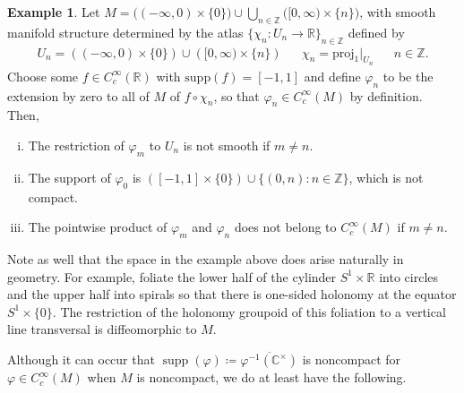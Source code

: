 \documentclass[12pt]{article}
\theoremstyle{plain}
\theoremstyle{definition}
\newtheorem{ex}[thm]{Example}
\newcommand{\R}{\mathbb{R}}
\newcommand{\Z}{\mathbb{Z}}
\newcommand{\C}{\mathbb{C}}
\newcommand{\supp}{\operatorname{supp}}
\numberwithin{equation}{section}
\begin{document}
\begin{ex}\label{nonHausex}
Let $M=\Big((-\infty,0) \times \{0\}\Big) \cup \bigcup_{n \in \Z} \Big([0,\infty) \times \{n\}\Big)$, 
with smooth manifold structure determined by the atlas $\{\chi_n :U_n \to \R\}_{n \in \Z}$ defined by
\begin{align*}
U_n  = \left((-\infty,0) \times \{0\}\right) \cup \left([0,\infty) \times \{n\} \right) &&
\chi_n = \mathrm{proj}_1|_{U_n} && n \in \Z.
\end{align*}
Choose some $f \in C_c^\infty(\R)$ with $\mathrm{supp}(f)=[-1,1]$ and define $\varphi_n$ to be the extension by zero to all of $M$ of $f \circ \chi_n$, so that $\varphi_n \in C_c^\infty(M)$ by definition. Then,
\begin{enumerate}[(i)]
\item The restriction of $\varphi_m$ to $U_n$ is not smooth if $m \neq n$.
\item The support  of $\varphi_0$ is $\left([-1,1] \times \{0 \} \right) \cup \{ (0,n) : n \in \Z \}$, which is not compact.
\item The pointwise product of $\varphi_m$ and $\varphi_n$ does not belong to $C_c^\infty(M)$ if $m \neq n$.
\end{enumerate}
\begin{center}
\end{center}
\end{ex}


Note as well that the space in the example above does arise naturally in geometry. For example, foliate the lower half of the cylinder $S^1 \times \R$ into circles and the upper half into spirals so that there is one-sided holonomy at the equator $S^1 \times \{0\}$. The restriction of the holonomy groupoid of this foliation to a vertical line  transversal is  diffeomorphic to $M$. 


Although it can occur that $\supp(\varphi) \coloneqq \overline{ \varphi^{-1}(\C^\times)}$ is noncompact for $\varphi \in C_c^\infty(M)$ when $M$ is noncompact, we do at least have the following.
\end{document}
